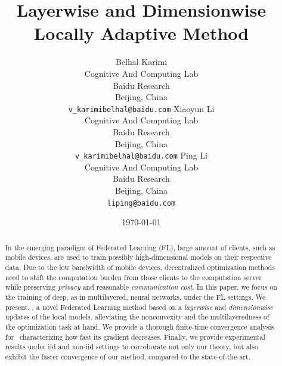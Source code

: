 \documentclass[11pt]{article}
\begin{document}
\title{Layerwise and Dimensionwise Locally Adaptive Method}


\author{
  Belhal Karimi \\
  Cognitive And Computing Lab\\
  Baidu Research\\
  Beijing, China \\
  \texttt{v_karimibelhal@baidu.com} 
   \And
    Xiaoyun Li \\
  Cognitive And Computing Lab\\
  Baidu Research\\
  Beijing, China \\
  \texttt{v_karimibelhal@baidu.com} 
      \And
  Ping Li \\
  Cognitive And Computing Lab\\
  Baidu Research\\
  Beijing, China \\
  \texttt{liping@baidu.com} \\
}

\date{\today}

\maketitle

\begin{abstract}\vspace{-0.1in}
In the emerging paradigm of Federated Learning (FL), large amount of clients, such as mobile devices, are used to train possibly high-dimensional models on their respective data.
Due to the low bandwidth of mobile devices, decentralized optimization methods need to shift the computation burden from those clients to the computation server while preserving \emph{privacy} and reasonable \emph{communication cost}.
In this paper, we focus on the training of deep, as in multilayered, neural networks, under the FL settings.
We present, \algo, a novel Federated Learning method based on a \emph{layerwise} and \emph{dimensionwise} updates of the local models, alleviating the nonconvexity and the multilayeredness of the optimization task at hand.
We provide a thorough finite-time convergence analysis for \algo\ characterizing how fast its gradient decreases.
Finally, we provide experimental results under iid and non-iid settings to corroborate not only our theory, but also exhibit the faster convergence of our method, compared to the state-of-the-art.
\end{abstract}
\end{document}
